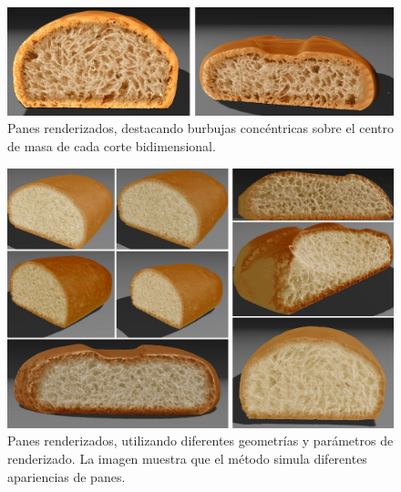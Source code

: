 \begin{figure}
  \centerline{\includegraphics[width=12cm]{figures/Fig11CAVW}}
  \caption{Panes renderizados, destacando burbujas concéntricas sobre el centro de masa de cada corte bidimensional.}
  \label{fg:Fig11}
\end{figure}

\begin{figure}
  \centerline{\includegraphics[width=15cm]{figures/Fig12CAVW}}
  \caption{Panes renderizados, utilizando diferentes geometrías y parámetros de renderizado. La imagen muestra que el método simula diferentes apariencias de panes.}
  \label{fg:Fig12}
\end{figure}

